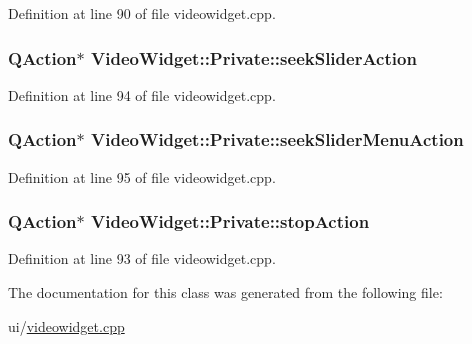 Definition at line 90 of file videowidget.\+cpp.

\hypertarget{classVideoWidget_1_1Private_ac16af65e0f9a05a84c853a2402c1ce26}{
\subsubsection[{seek\+Slider\+Action}]{\setlength{\rightskip}{0pt plus 5cm}Q\+Action$\ast$ Video\+Widget\+::\+Private\+::seek\+Slider\+Action}}\label{classVideoWidget_1_1Private_ac16af65e0f9a05a84c853a2402c1ce26}


Definition at line 94 of file videowidget.\+cpp.

\hypertarget{classVideoWidget_1_1Private_a638e1c16fe06792667af9d7296d7cc5e}{
\subsubsection[{seek\+Slider\+Menu\+Action}]{\setlength{\rightskip}{0pt plus 5cm}Q\+Action$\ast$ Video\+Widget\+::\+Private\+::seek\+Slider\+Menu\+Action}}\label{classVideoWidget_1_1Private_a638e1c16fe06792667af9d7296d7cc5e}


Definition at line 95 of file videowidget.\+cpp.

\hypertarget{classVideoWidget_1_1Private_a1c5aa30fc3d0f10c2cb4f4f76eca14db}{
\subsubsection[{stop\+Action}]{\setlength{\rightskip}{0pt plus 5cm}Q\+Action$\ast$ Video\+Widget\+::\+Private\+::stop\+Action}}\label{classVideoWidget_1_1Private_a1c5aa30fc3d0f10c2cb4f4f76eca14db}


Definition at line 93 of file videowidget.\+cpp.



The documentation for this class was generated from the following file\+:\begin{DoxyCompactItemize}
\item 
ui/\hyperlink{videowidget_8cpp}{videowidget.\+cpp}\end{DoxyCompactItemize}
